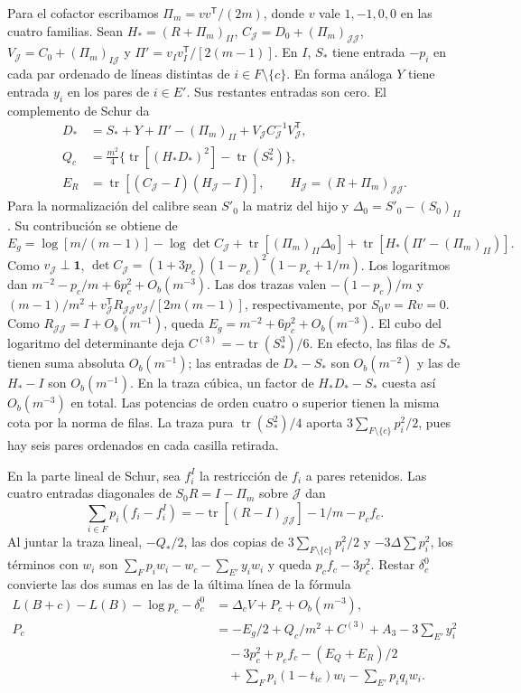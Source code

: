 Para el cofactor escribamos \(\Pi_m=vv^{\mathsf T}/(2m)\), donde \(v\) vale \(1,-1,0,0\)
en las cuatro familias. Sean \(H_*=(R+\Pi_m)_{II}\), \(C_{\mathcal J}=D_0+(\Pi_m)_{\mathcal J\mathcal J}\),
\(V_{\mathcal J}=C_0+(\Pi_m)_{I\mathcal J}\) y \(\Pi'=v_Iv_I^{\mathsf T}/[2(m-1)]\).
En \(I\), \(S_*\) tiene entrada \(-p_i\) en cada par ordenado de líneas distintas
de \(i\in F\setminus\{c\}\). En forma análoga \(Y\) tiene entrada \(y_i\) en los pares de
\(i\in E'\). Sus restantes entradas son cero. El complemento de Schur da
\begin{align*}
 D_*&=S_*+Y+\Pi'-(\Pi_m)_{II}+V_{\mathcal J} C_{\mathcal J}^{-1}V_{\mathcal J}^{\mathsf T},\\
 Q_c&=\tfrac{m^2}4\{\operatorname{tr}[(H_*D_*)^2]-\operatorname{tr}(S_*^2)\},\\
 E_R&=\operatorname{tr}[(C_{\mathcal J}-I)(H_{\mathcal J}-I)],\qquad H_{\mathcal J}=(R+\Pi_m)_{\mathcal
 J\mathcal J}.
\end{align*}
Para la normalización del calibre sean \(S'_0\) la matriz del hijo y
\(\Delta_0=S'_0-(S_0)_{II}\). Su contribución se obtiene de
\[
 E_g=\log[m/(m-1)]-\log\det C_{\mathcal J}
   +\operatorname{tr}[(\Pi_m)_{II}\Delta_0]
   +\operatorname{tr}[H_*(\Pi'-(\Pi_m)_{II})].
\]
Como \(v_{\mathcal J}\perp\mathbf1\), \(\det C_{\mathcal J}=(1+3p_c)(1-p_c)^2(1-p_c+1/m)\).
Los logaritmos dan \(m^{-2}-p_c/m+6p_c^2+O_b(m^{-3})\). Las dos trazas valen
\(-(1-p_c)/m\) y \((m-1)/m^2+v_{\mathcal J}^{\mathsf T}R_{\mathcal J\mathcal J}v_{\mathcal J}/[2m(m-1)]\),
 respectivamente,
por \(S_0v=Rv=0\). Como \(R_{\mathcal J\mathcal J}=I+O_b(m^{-1})\), queda \(E_g=m^{-2}+6p_c^2+O_b(m^{-3})\).
El cubo del logaritmo del determinante deja \(C^{(3)}=-\operatorname{tr}(S_*^3)/6\).
En efecto, las filas de \(S_*\) tienen suma absoluta \(O_b(m^{-1})\);
las entradas de \(D_*-S_*\) son \(O_b(m^{-2})\) y las de \(H_*-I\) son \(O_b(m^{-1})\).
En la traza cúbica, un factor de \(H_*D_*-S_*\) cuesta así \(O_b(m^{-3})\) en total.
Las potencias de orden cuatro o superior tienen la misma cota por la norma de filas.
La traza pura \(\operatorname{tr}(S_*^2)/4\) aporta
\(3\sum_{F\setminus\{c\}}p_i^2/2\), pues hay seis pares ordenados en cada casilla retirada.

En la parte lineal de Schur, sea \(f_i^I\) la restricción de \(f_i\) a pares retenidos.
Las cuatro entradas diagonales de \(S_0R=I-\Pi_m\) sobre \(\mathcal J\) dan
\[
 \sum_{i\in F}p_i(f_i-f_i^I)
 =-\operatorname{tr}[(R-I)_{\mathcal J\mathcal J}]-1/m-p_cf_c .
\]
Al juntar la traza lineal, \(-Q_*/2\), las dos copias de
\(3\sum_{F\setminus\{c\}}p_i^2/2\) y \(-3\Delta\sum p_i^2\), los términos con \(w_i\)
son \(\sum_F p_iw_i-w_c-\sum_{E'}y_iw_i\) y queda \(p_cf_c-3p_c^2\).
Restar \(\delta_c^0\) convierte las dos sumas en las de la última línea de la fórmula
\begin{align*}
 L(B+c)-L(B)-\log p_c-\delta_c^0
   &=\Delta_c V+P_c+O_b(m^{-3}),\\
 P_c&=-E_g/2+Q_c/m^2+C^{(3)}+A_3-3\sum_{E'}y_i^2\\
 &\quad-3p_c^2+p_cf_c-(E_Q+E_R)/2\\
 &\quad+\sum_F p_i(1-t_{ic})w_i-\sum_{E'}p_iq_iw_i .
\end{align*}
